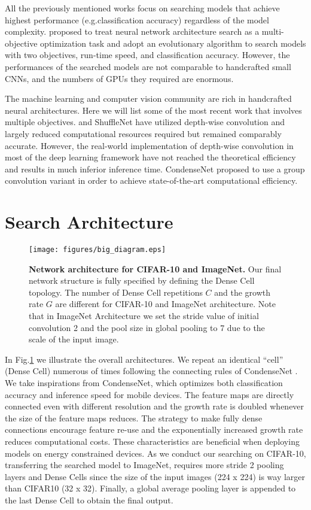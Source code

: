 \documentclass[runningheads]{llncs}
\def\eg{e.g.}
\begin{document}
All the previously mentioned works focus on searching models that achieve highest performance (\eg classification accuracy) regardless of the model complexity. \cite{kimnemo} proposed to treat neural network architecture search as a multi-objective optimization task and adopt an evolutionary algorithm to search models with two objectives, run-time speed, and classification accuracy. However, the performances of the searched models are not comparable to handcrafted small CNNs, and the numbers of GPUs they required are enormous.

The machine learning and computer vision community are rich in handcrafted neural architectures. Here we will list some of the most recent work that involves multiple objectives. \cite{howard2017mobilenets} and ShuffleNet \cite{zhang2017shufflenet} have utilized depth-wise convolution and largely reduced computational resources required but remained comparably accurate. However, the real-world implementation of depth-wise convolution in most of the deep learning framework have not reached the theoretical efficiency and results in much inferior inference time. CondenseNet \cite{huang2017condensenet} proposed to use a group convolution \cite{krizhevsky2012imagenet} variant in order to achieve state-of-the-art computational efficiency.
\section{Search Architecture}\begin{figure}[h]
\centering     %
\texttt{[image: figures/big\_diagram.eps]}
\caption{\textbf{Network architecture for CIFAR-10 and ImageNet.}
Our final network structure is fully specified by defining the Dense Cell topology. The number of Dense Cell repetitions $C$ and the growth rate $G$ are different for CIFAR-10 and ImageNet architecture. Note that in ImageNet Architecture we set the stride value of initial convolution 2 and the pool size in global pooling to 7 due to the scale of the input image.}
\label{fig.bigdiagram}
\end{figure}

In Fig.\ref{fig.bigdiagram} we illustrate the overall architectures. We repeat an identical ``cell'' (Dense Cell) numerous of times following the connecting rules of CondenseNet \cite{huang2017condensenet}. We take inspirations from CondenseNet, which optimizes both classification accuracy and inference speed for mobile devices. The feature maps are directly connected even with different resolution and the growth rate is doubled whenever the size of the feature maps reduces. The strategy to make fully dense connections encourage feature re-use and the exponentially increased growth rate reduces computational costs. These characteristics are beneficial when deploying models on energy constrained devices. As we conduct our searching on CIFAR-10, transferring the searched model to ImageNet, requires more stride 2 pooling layers and Dense Cells since the size of the input images (224 x 224) is way larger than CIFAR10 (32 x 32). Finally, a global average pooling layer is appended to the last Dense Cell to obtain the final output.
\end{document}
